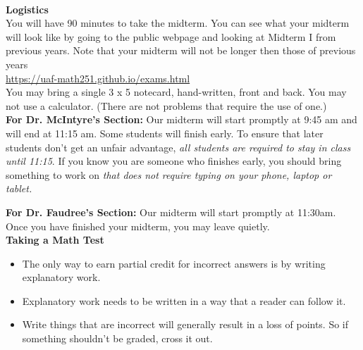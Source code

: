 \documentclass[11pt,fleqn]{article}
\begin{document}
\renewcommand{\headrulewidth}{0pt}
\newcommand{\blank}[1]{\rule{#1}{0.75pt}}
\newcommand{\bc}{\begin{center}}
\newcommand{\ec}{\end{center}}
\renewcommand{\d}{\displaystyle}

\vspace*{-0.7in}

\begin{center}
  \large
  \\
\end{center}
\noindent\textbf{Logistics}\\

You will have 90 minutes to take the midterm. You can see what your midterm will look like by going to the public webpage and looking at Midterm I from previous years. Note that your midterm will not be longer then those of previous years\\

\url{https://uaf-math251.github.io/exams.html}\\

You may bring a single 3 x 5 notecard, hand-written, front and back. You may not use a calculator. (There are not problems that require the use of one.)\\

\textbf{For Dr. McIntyre's Section:} Our midterm will start promptly at 9:45 am and will end at 11:15 am.  Some students will finish early. To ensure that later students don't get an unfair advantage, \emph{all students are required to stay in class until 11:15}. If you know you are someone who finishes early, you should bring something to work on \emph{that does not require typing on your phone, laptop or tablet.}

\textbf{For Dr. Faudree's Section:} Our midterm will start promptly at 11:30am.  Once you have finished your midterm, you may leave quietly.\\

\noindent\textbf{Taking a Math Test}

\begin{itemize}
\item The only way to earn partial credit for incorrect answers is by writing explanatory work.
\item Explanatory work needs to be written in a way that a reader can follow it.
\item Write things that are incorrect will generally result in a loss of points. So if something shouldn't be graded, cross it out.
\end{itemize}
\end{document}
